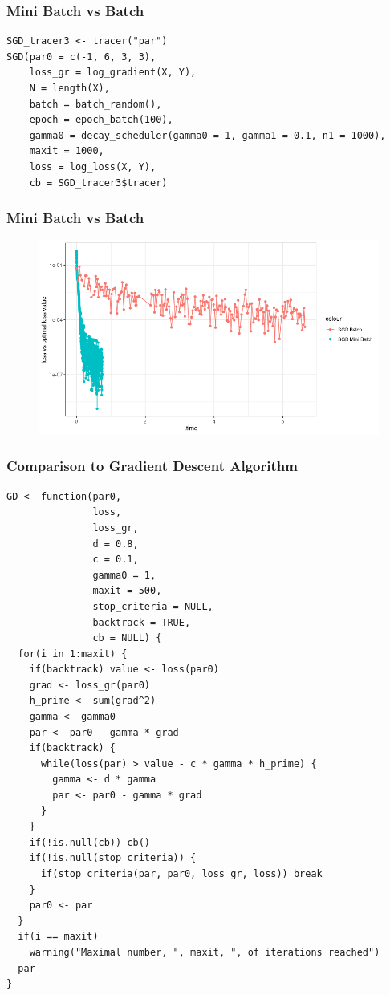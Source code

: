\documentclass[aspectratio=169]{beamer}
\begin{document}
\begin{frame}[fragile]
    \frametitle{Mini Batch vs Batch}
\begin{verbatim}
SGD_tracer3 <- tracer("par")
SGD(par0 = c(-1, 6, 3, 3),
    loss_gr = log_gradient(X, Y),
    N = length(X),
    batch = batch_random(),
    epoch = epoch_batch(100),
    gamma0 = decay_scheduler(gamma0 = 1, gamma1 = 0.1, n1 = 1000),
    maxit = 1000,
    loss = log_loss(X, Y),
    cb = SGD_tracer3$tracer)
\end{verbatim}
\end{frame}
\begin{frame}
    \frametitle{Mini Batch vs Batch}    
    \begin{figure}
        \centering
        \includegraphics[scale = 0.6]{figure/BatchVsMini.png}
    \end{figure}
\end{frame}
\begin{frame}[fragile]
    \frametitle{Comparison to Gradient Descent Algorithm}    
\begin{verbatim}
GD <- function(par0, 
               loss, 
               loss_gr, 
               d = 0.8, 
               c = 0.1, 
               gamma0 = 1,
               maxit = 500,
               stop_criteria = NULL,
               backtrack = TRUE,
               cb = NULL) {
  for(i in 1:maxit) {
    if(backtrack) value <- loss(par0)
    grad <- loss_gr(par0)
    h_prime <- sum(grad^2)
    gamma <- gamma0
    par <- par0 - gamma * grad
    if(backtrack) {
      while(loss(par) > value - c * gamma * h_prime) {
        gamma <- d * gamma
        par <- par0 - gamma * grad
      }
    }
    if(!is.null(cb)) cb()
    if(!is.null(stop_criteria)) {
      if(stop_criteria(par, par0, loss_gr, loss)) break
    }
    par0 <- par
  }
  if(i == maxit)
    warning("Maximal number, ", maxit, ", of iterations reached")
  par
}
\end{verbatim}
\end{frame}
\end{document}
